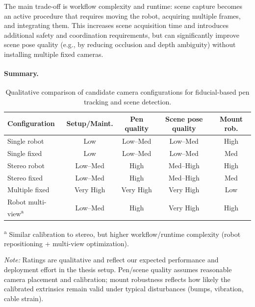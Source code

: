 The main trade-off is workflow complexity and runtime: scene capture becomes an active procedure that requires moving the robot, acquiring multiple frames, and integrating them. This increases scene acquisition time and introduces additional safety and coordination requirements, but can significantly improve scene pose quality (e.g., by reducing occlusion and depth ambiguity) without installing multiple fixed cameras.

\paragraph{Summary.}

\begin{table}[t]
\centering
\caption[Comparison of candidate camera configurations]{%
Qualitative comparison of candidate camera configurations for fiducial-based pen tracking and scene detection.%
}
\label{tab:camera_config_comparison}

\small
\setlength{\tabcolsep}{4pt}
\renewcommand{\arraystretch}{1.1}
\begin{tabular}{l c c c c}
\toprule
Configuration & Setup/Maint. & Pen quality & Scene pose quality & Mount rob. \\
\midrule
Single robot & Low & Low--Med & Low--Med & High \\
Single fixed & Low & Low--Med & Low--Med & Med \\
Stereo robot & Low--Med & High & Med--High & High \\
Stereo fixed & Low--Med & High & Med--High & Med \\
Multiple fixed & Very High & Very High & Very High & Low \\
Robot multi-view\textsuperscript{a} & Low--Med & High & Very High & High \\
\bottomrule
\end{tabular}

\vspace{0.4em}
\footnotesize
\textsuperscript{a} Similar calibration to stereo, but higher workflow/runtime complexity (robot repositioning + multi-view optimization).

\emph{Note:} Ratings are qualitative and reflect our expected performance and deployment effort in the thesis setup. Pen/scene quality assumes reasonable camera placement and calibration; mount robustness reflects how likely the calibrated extrinsics remain valid under typical disturbances (bumps, vibration, cable strain).
\end{table}

